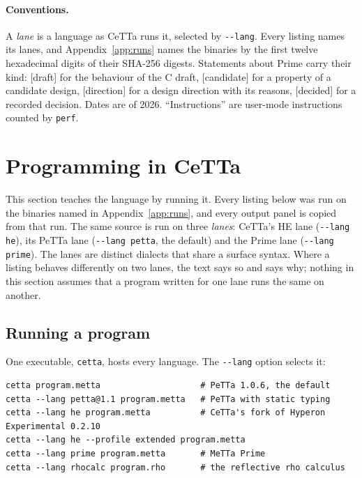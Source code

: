 \documentclass[11pt]{article}
\newcommand{\code}[1]{\texttt{#1}}
\newcommand{\kind}[1]{\textsf{\small[#1]}}
\newcommand{\PeTTa}{\textup{PeTTa}}
\newcommand{\HE}{\textup{HE}}
\newcommand{\CeTTa}{\textup{CeTTa}}
\begin{document}
\paragraph{Conventions.}  A \emph{lane} is a language as \CeTTa{} runs it,
selected by \code{-{}-lang}.  Every listing names its lanes, and
Appendix~\ref{app:runs} names the binaries by the first twelve hexadecimal
digits of their SHA-256 digests.  Statements about Prime carry their kind:
\kind{draft} for the behaviour of the C draft, \kind{candidate} for a
property of a candidate design, \kind{direction} for a design direction with
its reasons, \kind{decided} for a recorded decision.  Dates are of 2026.
``Instructions'' are user-mode instructions counted by \code{perf}.

\section{Programming in \CeTTa{}}
\label{sec:tutorial}

This section teaches the language by running it.  Every listing below was run
on the binaries named in Appendix~\ref{app:runs}, and every output panel is
copied from that run.  The same source is run on three \emph{lanes}: \CeTTa{}'s
\HE{} lane (\code{-{}-lang he}), its \PeTTa{} lane (\code{-{}-lang petta}, the
default) and the Prime lane (\code{-{}-lang prime}).  The lanes are distinct
dialects that share a surface syntax.  Where a listing behaves differently on
two lanes, the text says so and says why; nothing in this section assumes that
a program written for one lane runs the same on another.

\subsection{Running a program}
\label{sec:tut-running}

One executable, \code{cetta}, hosts every language.  The \code{-{}-lang} option
selects it:

\begin{lstlisting}[style=metta]
cetta program.metta                    # PeTTa 1.0.6, the default
cetta --lang petta@1.1 program.metta   # PeTTa with static typing
cetta --lang he program.metta          # CeTTa's fork of Hyperon Experimental 0.2.10
cetta --lang he --profile extended program.metta
cetta --lang prime program.metta       # MeTTa Prime
cetta --lang rhocalc program.rho       # the reflective rho calculus
\end{lstlisting}
\end{document}

